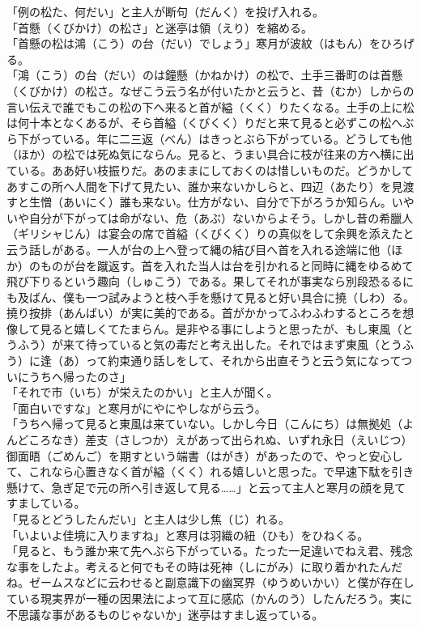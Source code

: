 「例の松た、何だい」と主人が断句（だんく）を投げ入れる。\\
「首懸（くびかけ）の松さ」と迷亭は領（えり）を縮める。\\
「首懸の松は鴻（こう）の台（だい）でしょう」寒月が波紋（はもん）をひろげる。\\
「鴻（こう）の台（だい）のは鐘懸（かねかけ）の松で、土手三番町のは首懸（くびかけ）の松さ。なぜこう云う名が付いたかと云うと、昔（むか）しからの言い伝えで誰でもこの松の下へ来ると首が縊（くく）りたくなる。土手の上に松は何十本となくあるが、そら首縊（くびくく）りだと来て見ると必ずこの松へぶら下がっている。年に二三返（べん）はきっとぶら下がっている。どうしても他（ほか）の松では死ぬ気にならん。見ると、うまい具合に枝が往来の方へ横に出ている。ああ好い枝振りだ。あのままにしておくのは惜しいものだ。どうかしてあすこの所へ人間を下げて見たい、誰か来ないかしらと、四辺（あたり）を見渡すと生憎（あいにく）誰も来ない。仕方がない、自分で下がろうか知らん。いやいや自分が下がっては命がない、危（あぶ）ないからよそう。しかし昔の希臘人（ギリシャじん）は宴会の席で首縊（くびくく）りの真似をして余興を添えたと云う話しがある。一人が台の上へ登って縄の結び目へ首を入れる途端に他（ほか）のものが台を蹴返す。首を入れた当人は台を引かれると同時に縄をゆるめて飛び下りるという趣向（しゅこう）である。果してそれが事実なら別段恐るるにも及ばん、僕も一つ試みようと枝へ手を懸けて見ると好い具合に撓（しわ）る。撓り按排（あんばい）が実に美的である。首がかかってふわふわするところを想像して見ると嬉しくてたまらん。是非やる事にしようと思ったが、もし東風（とうふう）が来て待っていると気の毒だと考え出した。それではまず東風（とうふう）に逢（あ）って約束通り話しをして、それから出直そうと云う気になってついにうちへ帰ったのさ」\\
「それで市（いち）が栄えたのかい」と主人が聞く。\\
「面白いですな」と寒月がにやにやしながら云う。\\
「うちへ帰って見ると東風は来ていない。しかし今日（こんにち）は無拠処（よんどころなき）差支（さしつか）えがあって出られぬ、いずれ永日（えいじつ）御面晤（ごめんご）を期すという端書（はがき）があったので、やっと安心して、これなら心置きなく首が縊（くく）れる嬉しいと思った。で早速下駄を引き懸けて、急ぎ足で元の所へ引き返して見る\ldots{}\ldots{}」と云って主人と寒月の顔を見てすましている。\\
「見るとどうしたんだい」と主人は少し焦（じ）れる。\\
「いよいよ佳境に入りますね」と寒月は羽織の紐（ひも）をひねくる。\\
「見ると、もう誰か来て先へぶら下がっている。たった一足違いでねえ君、残念な事をしたよ。考えると何でもその時は死神（しにがみ）に取り着かれたんだね。ゼームスなどに云わせると副意識下の幽冥界（ゆうめいかい）と僕が存在している現実界が一種の因果法によって互に感応（かんのう）したんだろう。実に不思議な事があるものじゃないか」迷亭はすまし返っている。\\
